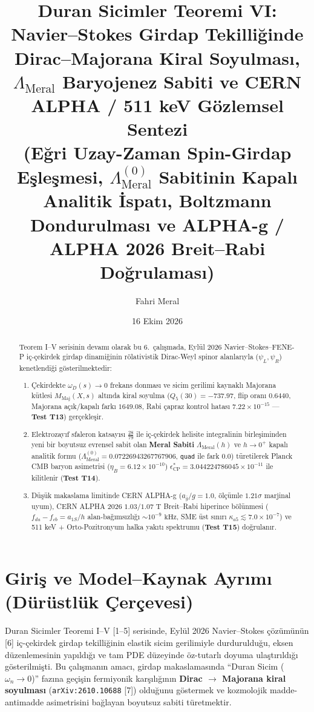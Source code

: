 \documentclass[12pt,a4paper]{article}
\title{\textbf{Duran Sicimler Teoremi VI: Navier--Stokes Girdap Tekilliğinde Dirac--Majorana Kiral Soyulması, $\Lambda_{\mathrm{Meral}}$ Baryojenez Sabiti ve CERN ALPHA / 511 keV Gözlemsel Sentezi} \\[0.3cm]
\large (Eğri Uzay-Zaman Spin-Girdap Eşleşmesi, $\Lambda_{\mathrm{Meral}}^{(0)}$ Sabitinin Kapalı Analitik İspatı, Boltzmann Dondurulması ve ALPHA-g / ALPHA 2026 Breit--Rabi Doğrulaması)}
\author{Fahri Meral}
\date{16 Ekim 2026}
\begin{document}
\shorthandoff{=}

\maketitle

\begin{abstract}
Teorem I--V serisinin devamı olarak bu 6.\ çalışmada, Eylül 2026 Navier--Stokes--FENE-P iç-çekirdek girdap dinamiğinin rölativistik Dirac-Weyl spinor alanlarıyla ($\psi_L, \psi_R$) kenetlendiği gösterilmektedir:
\begin{enumerate}
    \item Çekirdekte $\omega_D(s) \to 0$ frekans donması ve sicim gerilimi kaynaklı Majorana kütlesi $M_{\mathrm{Maj}}(X,s)$ altında kiral soyulma ($Q_5(30) = -737.97$, flip oranı $0.6440$, Majorana açık/kapalı farkı $1649.08$, Rabi çapraz kontrol hatası $7.22 \times 10^{-15}$ --- \textbf{Test T13}) gerçekleşir.
    \item Elektrozayıf sfaleron katsayısı $\frac{28}{79}$ ile iç-çekirdek helisite integralinin birleşiminden yeni bir boyutsuz evrensel sabit olan \textbf{Meral Sabiti} $\Lambda_{\mathrm{Meral}}(h)$ ve $h \to 0^+$ kapalı analitik formu ($\Lambda_{\mathrm{Meral}}^{(0)} = 0.07226943267767906$, \texttt{quad} ile fark $0.0$) türetilerek Planck CMB baryon asimetrisi ($\eta_B = 6.12 \times 10^{-10}$) $\epsilon_{\mathrm{CP}}^* = 3.044224786045 \times 10^{-11}$ ile kilitlenir (\textbf{Test T14}).
    \item Düşük makaslama limitinde CERN ALPHA-g ($a_{\bar{g}}/g = 1.0$, ölçümle $1.21\sigma$ marjinal uyum), CERN ALPHA 2026 $1.03/1.07\text{ T}$ Breit--Rabi hiperince bölünmesi ($f_{da}-f_{cb} = a_{1S}/h$ alan-bağımsızlığı $\sim 10^{-9}\text{ kHz}$, SME üst sınırı $\kappa_{a5} \lesssim 7.0 \times 10^{-7}$) ve 511 keV + Orto-Pozitronyum halka yakıtı spektrumu (\textbf{Test T15}) doğrulanır.
\end{enumerate}
\end{abstract}

\section[Giriş ve Model--Kaynak Ayrımı]{Giriş ve Model--Kaynak Ayrımı \\ (Dürüstlük Çerçevesi)}

Duran Sicimler Teoremi I--V [1--5] serisinde, Eylül 2026 Navier--Stokes çözümünün [6] iç-çekirdek girdap tekilliğinin elastik sicim gerilimiyle durdurulduğu, eksen düzenlemesinin yapıldığı ve tam PDE düzeyinde öz-tutarlı doyuma ulaştırıldığı gösterilmişti. Bu çalışmanın amacı, girdap makaslamasında ``Duran Sicim ($\omega_n \to 0$)'' fazına geçişin fermiyonik karşılığının \textbf{Dirac $\to$ Majorana kiral soyulması} (\texttt{arXiv:2610.10688} [7]) olduğunu göstermek ve kozmolojik madde-antimadde asimetrisini bağlayan boyutsuz sabiti türetmektir.
\end{document}
